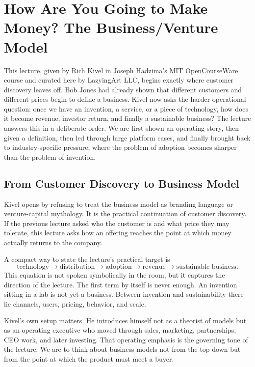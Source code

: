 \chapter{How Are You Going to Make Money? The Business/Venture Model}

This lecture, given by Rich Kivel in Joseph Hadzima's MIT OpenCourseWare course and curated here by LazyingArt LLC, begins exactly where customer discovery leaves off. Bob Jones had already shown that different customers and different prices begin to define a business. Kivel now asks the harder operational question: once we have an invention, a service, or a piece of technology, how does it become revenue, investor return, and finally a sustainable business? The lecture answers this in a deliberate order. We are first shown an operating story, then given a definition, then led through large platform cases, and finally brought back to industry-specific pressure, where the problem of adoption becomes sharper than the problem of invention.

\section{From Customer Discovery to Business Model}

Kivel opens by refusing to treat the business model as branding language or venture-capital mythology. It is the practical continuation of customer discovery. If the previous lecture asked who the customer is and what price they may tolerate, this lecture asks how an offering reaches the point at which money actually returns to the company.

A compact way to state the lecture's practical target is
\begin{equation}
\text{technology} \to \text{distribution} \to \text{adoption} \to \text{revenue} \to \text{sustainable business}.
\end{equation}
This equation is not spoken symbolically in the room, but it captures the direction of the lecture. The first term by itself is never enough. An invention sitting in a lab is not yet a business. Between invention and sustainability there lie channels, users, pricing, behavior, and scale.

Kivel's own setup matters. He introduces himself not as a theorist of models but as an operating executive who moved through sales, marketing, partnerships, CEO work, and later investing. That operating emphasis is the governing tone of the lecture. We are to think about business models not from the top down but from the point at which the product must meet a buyer.

